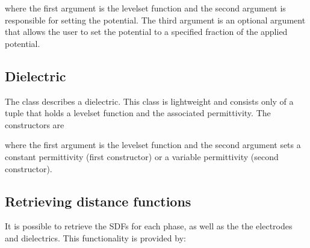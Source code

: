 \documentclass[letterpaper,10pt,english]{sphinxmanual}
\begin{document}
\begin{sphinxVerbatim}[commandchars=\\\{\},formatcom=\scriptsize]
       
\end{sphinxVerbatim}

where the first argument is the level\sphinxhyphen{}set function and the second argument is responsible for setting the potential. The third argument is an optional argument that allows the user to set the potential to a specified fraction of the applied potential.


\subsection{Dielectric}
\label{\detokenize{Source/ComputationalGeometry:dielectric}}\label{\detokenize{Source/ComputationalGeometry:chap-dielectric}}
The  class describes a dielectric.
This class is lightweight and consists only of a tuple that holds a level\sphinxhyphen{}set function and the associated permittivity.
The constructors are

\begin{sphinxVerbatim}[commandchars=\\\{\},formatcom=\scriptsize]
   
     
\end{sphinxVerbatim}

where the first argument is the level\sphinxhyphen{}set function and the second argument sets a constant permittivity (first constructor) or a variable permittivity (second constructor).


\subsection{Retrieving distance functions}
\label{\detokenize{Source/ComputationalGeometry:retrieving-distance-functions}}
It is possible to retrieve the SDFs for each phase, as well as the the electrodes and dielectrics.
This functionality is provided by:
\end{document}
